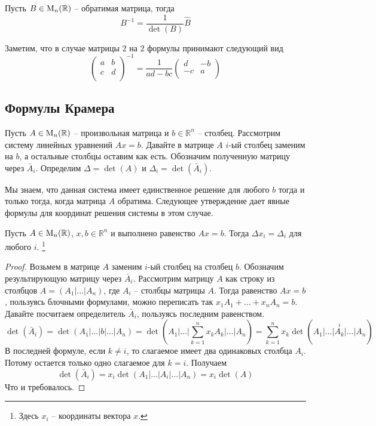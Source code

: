 \begin{claim}
Пусть $B\in\operatorname{M}_{n}(\mathbb R)$ -- обратимая матрица, тогда 
\[
B^{-1} = \frac{1}{\det(B)}\hat B
\]
\end{claim}

Заметим, что в случае матрицы $2$ на $2$ формулы принимают следующий вид
\[
\begin{pmatrix}
{a}&{b}\\
{c}&{d}\\
\end{pmatrix}^{-1}
=
\frac{1}{ad - bc}
\begin{pmatrix}
{d}&{-b}\\
{-c}&{a}\\
\end{pmatrix}
\]


\subsection{Формулы Крамера}

Пусть $A\in\operatorname{M}_{n}(\mathbb R)$ -- произвольная матрица и $b\in\mathbb R^n$ -- столбец.
Рассмотрим систему линейных уравнений $Ax = b$.
Давайте в матрице $A$ $i$-ый столбец заменим на $b$, а остальные столбцы оставим как есть.
Обозначим полученную матрицу через $\bar A_i$.
Определим $\Delta = \det (A)$ и $\Delta_i = \det (\bar A_i)$.

Мы знаем, что данная система имеет единственное решение для любого $b$ тогда и только тогда, когда матрица $A$ обратима.
Следующее утверждение дает явные формулы для координат решения системы в этом случае.

\begin{claim}
Пусть $A\in\operatorname{M}_{n}(\mathbb R)$, $x,b\in \mathbb R^n$ и выполнено равенство $Ax = b$.
Тогда $\Delta x_i = \Delta_i$ для любого $i$.%
\footnote{Здесь $x_i$ -- координаты вектора $x$.}
\end{claim}
\begin{proof}
Возьмем в матрице $A$ заменим $i$-ый столбец на столбец $b$.
Обозначим результирующую матрицу через $\bar A_i$.
Рассмотрим матрицу $A$ как строку из столбцов $A = (A_1|\ldots|A_n)$, где $A_i$ -- столбцы матрицы $A$.
Тогда равенство $Ax = b$, пользуясь блочными формулами, можно переписать так $x_1 A_1 + \ldots + x_n A_n = b$.
Давайте посчитаем определитель $\bar A_i$, пользуясь последним равенством.
\[
\det (\bar A_i) = \det(A_1|\ldots|b|\ldots|A_n) = \det(A_1|\ldots|\sum_{k=1}^n x_k A_k|\ldots|A_n) = \sum_{k=1}^n x_k \det (
\stackrel{i}{A_1|\ldots|A_k|\ldots|A_n})
\]
В последней формуле, если $k\neq i$, то слагаемое имеет два одинаковых столбца $A_i$.
Потому остается только одно слагаемое для $k = i$.
Получаем
\[
\det(\bar A_i) = x_i \det(A_1|\ldots|A_i|\ldots|A_n) = x_i \det(A)
\]
Что и требовалось.
\end{proof}

